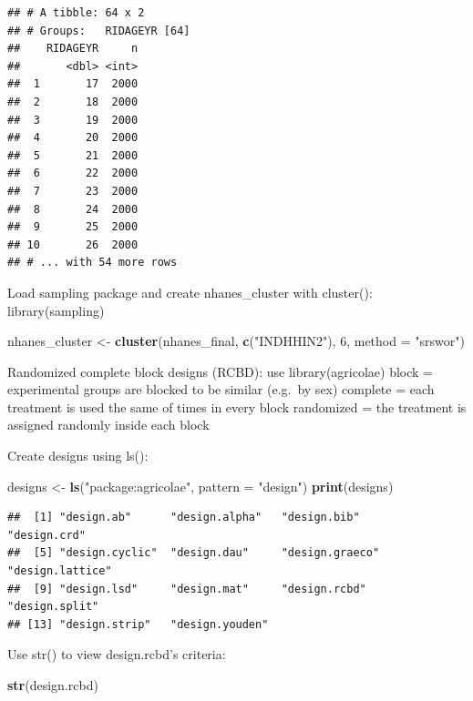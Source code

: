 \documentclass[]{book}
\newenvironment{Shaded}{\begin{snugshade}}{\end{snugshade}}
\newcommand{\DataTypeTok}[1]{\textcolor[rgb]{0.13,0.29,0.53}{#1}}
\newcommand{\DecValTok}[1]{\textcolor[rgb]{0.00,0.00,0.81}{#1}}
\newcommand{\KeywordTok}[1]{\textcolor[rgb]{0.13,0.29,0.53}{\textbf{#1}}}
\newcommand{\NormalTok}[1]{#1}
\newcommand{\StringTok}[1]{\textcolor[rgb]{0.31,0.60,0.02}{#1}}
\begin{document}
\begin{verbatim}
## # A tibble: 64 x 2
## # Groups:   RIDAGEYR [64]
##    RIDAGEYR     n
##       <dbl> <int>
##  1       17  2000
##  2       18  2000
##  3       19  2000
##  4       20  2000
##  5       21  2000
##  6       22  2000
##  7       23  2000
##  8       24  2000
##  9       25  2000
## 10       26  2000
## # ... with 54 more rows
\end{verbatim}

Load sampling package and create nhanes\_cluster with cluster(): library(sampling)

\begin{Shaded}
\begin{Highlighting}[]
\NormalTok{nhanes_cluster <-}\StringTok{ }\KeywordTok{cluster}\NormalTok{(nhanes_final, }\KeywordTok{c}\NormalTok{(}\StringTok{"INDHHIN2"}\NormalTok{), }\DecValTok{6}\NormalTok{, }\DataTypeTok{method =} \StringTok{"srswor"}\NormalTok{)}
\end{Highlighting}
\end{Shaded}

Randomized complete block designs (RCBD): use library(agricolae)
block = experimental groups are blocked to be similar (e.g.~by sex)
complete = each treatment is used the same of times in every block
randomized = the treatment is assigned randomly inside each block

Create designs using ls():

\begin{Shaded}
\begin{Highlighting}[]
\NormalTok{designs <-}\StringTok{ }\KeywordTok{ls}\NormalTok{(}\StringTok{"package:agricolae"}\NormalTok{, }\DataTypeTok{pattern =} \StringTok{"design"}\NormalTok{)}
\KeywordTok{print}\NormalTok{(designs)}
\end{Highlighting}
\end{Shaded}

\begin{verbatim}
##  [1] "design.ab"      "design.alpha"   "design.bib"     "design.crd"    
##  [5] "design.cyclic"  "design.dau"     "design.graeco"  "design.lattice"
##  [9] "design.lsd"     "design.mat"     "design.rcbd"    "design.split"  
## [13] "design.strip"   "design.youden"
\end{verbatim}

Use str() to view design.rcbd's criteria:

\begin{Shaded}
\begin{Highlighting}[]
\KeywordTok{str}\NormalTok{(design.rcbd)}
\end{Highlighting}
\end{Shaded}
\end{document}
